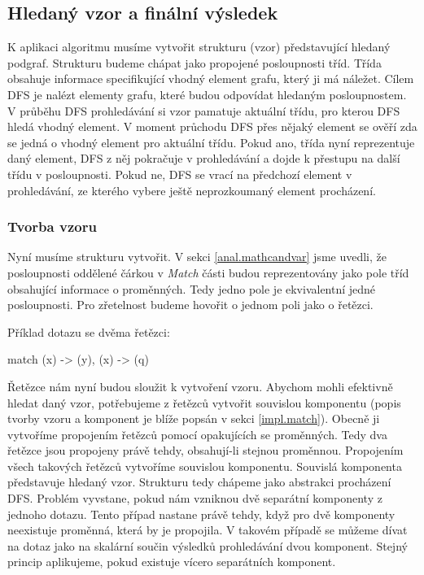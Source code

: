 \subsection{Hledaný vzor a finální výsledek} \label{anal.match.res}

K aplikaci algoritmu musíme vytvořit strukturu (vzor) představující hledaný podgraf.
Strukturu budeme chápat jako propojené posloupnosti tříd.
Třída obsahuje informace specifikující vhodný element grafu, který ji má náležet.
Cílem DFS je nalézt elementy grafu, které budou odpovídat hledaným posloupnostem.
V průběhu DFS prohledávání si vzor pamatuje aktuální třídu, pro kterou DFS hledá vhodný element.
V moment průchodu DFS přes nějaký element se ověří zda se jedná o vhodný element pro aktuální třídu.
Pokud ano, třída nyní reprezentuje daný element, DFS z něj pokračuje v prohledávání a dojde k přestupu na další třídu v posloupnosti.
Pokud ne, DFS se vrací na předchozí element v prohledávání, ze kterého vybere ještě neprozkoumaný element procházení.

\subsubsection{Tvorba vzoru}

Nyní musíme strukturu vytvořit.
V sekci \ref{anal.mathcandvar} jsme uvedli, že posloupnosti oddělené čárkou v \textit{Match} části budou reprezentovány jako pole tříd obsahující informace o proměnných.
Tedy jedno pole je ekvivalentní jedné posloupnosti.
Pro zřetelnost budeme hovořit o jednom poli jako o řetězci.

Příklad dotazu se dvěma řetězci:
\begin{code}
match (x) -> (y), (x) -> (q)
\end{code}

Řetězce nám nyní budou sloužit k vytvoření vzoru.
Abychom mohli efektivně hledat daný vzor, potřebujeme z řetězců vytvořit souvislou komponentu
(popis tvorby vzoru a komponent je blíže popsán v sekci \ref{impl.match}). 
Obecně ji vytvoříme propojením řetězců pomocí opakujících se proměnných.
Tedy dva řetězce jsou propojeny právě tehdy, obsahují-li stejnou proměnnou. 
Propojením všech takových řetězců vytvoříme souvislou komponentu.
Souvislá komponenta představuje hledaný vzor.
Strukturu tedy chápeme jako abstrakci procházení DFS.
Problém vyvstane, pokud nám vzniknou dvě separátní komponenty z jednoho dotazu.
Tento případ nastane právě tehdy, když pro dvě komponenty neexistuje proměnná, která by je propojila.
V takovém případě se můžeme dívat na dotaz jako na skalární součin výsledků prohledávání dvou komponent.
Stejný princip aplikujeme, pokud existuje vícero separátních komponent.

